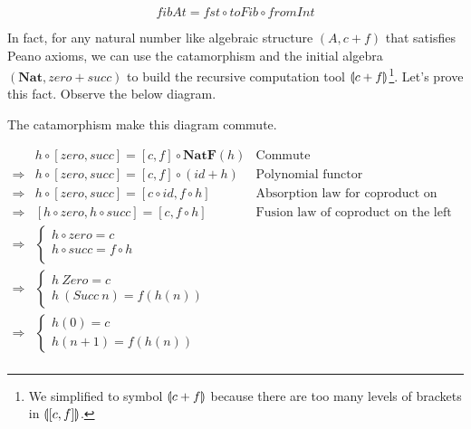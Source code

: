 \documentclass{article}
\begin{document}
\[
fibAt = fst \circ toFib \circ fromInt
\]

In fact, for any natural number like algebraic structure $(A, c + f)$ that satisfies Peano axioms, we can use the catamorphism and the initial algebra $(\mathbf{Nat}, zero + succ)$ to build the recursive computation tool $\llparenthesis c + f \rrparenthesis$\footnote{We simplified to symbol $\llparenthesis c + f \rrparenthesis$ because there are too many levels of brackets in $\llparenthesis [c, f] \rrparenthesis$.}. Let's prove this fact. Observe the below diagram.

\begin{center}
\end{center}

The catamorphism make this diagram commute.

\[
\begin{array}{rll}
            & h \circ [zero, succ] = [c, f] \circ \mathbf{NatF}(h) & \text{Commute} \\
\Rightarrow & h \circ [zero, succ] = [c, f] \circ (id + h) & \text{Polynomial functor} \\
\Rightarrow & h \circ [zero, succ] = [c \circ id, f \circ h] & \text{Absorption law for coproduct on the right} \\
\Rightarrow & [h \circ zero, h \circ succ] = [c, f \circ h] & \text{Fusion law of coproduct on the left} \\
\Rightarrow &
  \begin{cases}
    h \circ zero = c \\
    h \circ succ = f \circ h \\
  \end{cases} & \\
\Rightarrow &
  \begin{cases}
    h\ Zero = c \\
    h\ (Succ\ n) = f(h(n))
  \end{cases} & \\
\Rightarrow &
  \begin{cases}
    h(0) = c \\
    h(n + 1) = f(h(n))
  \end{cases} & \\
\end{array}
\]
\end{document}
